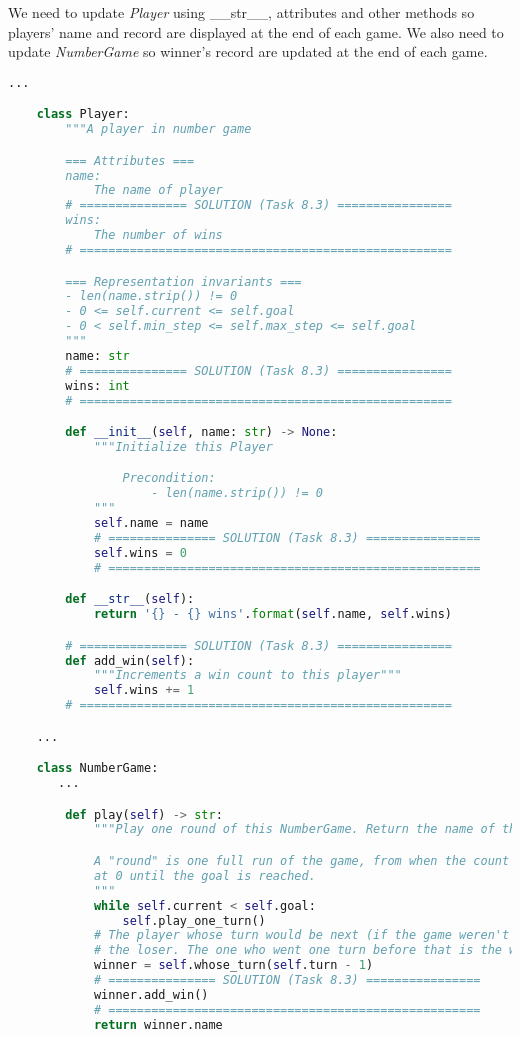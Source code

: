 \documentclass[12pt]{article}
\begin{document}
We need to update \textit{Player} using \_\_str\_\_, attributes and other methods
so players' name and record are displayed at the end of each game. We also need to
update \textit{NumberGame} so winner's record are updated at the end of each game.

\bigskip

\begin{lstlisting}[language=Python]
    ...

    class Player:
        """A player in number game

        === Attributes ===
        name:
            The name of player
        # =============== SOLUTION (Task 8.3) ================
        wins:
            The number of wins
        # ====================================================

        === Representation invariants ===
        - len(name.strip()) != 0
        - 0 <= self.current <= self.goal
        - 0 < self.min_step <= self.max_step <= self.goal
        """
        name: str
        # =============== SOLUTION (Task 8.3) ================
        wins: int
        # ====================================================

        def __init__(self, name: str) -> None:
            """Initialize this Player

                Precondition:
                    - len(name.strip()) != 0
            """
            self.name = name
            # =============== SOLUTION (Task 8.3) ================
            self.wins = 0
            # ====================================================

        def __str__(self):
            return '{} - {} wins'.format(self.name, self.wins)

        # =============== SOLUTION (Task 8.3) ================
        def add_win(self):
            """Increments a win count to this player"""
            self.wins += 1
        # ====================================================

    ...

    class NumberGame:
       ...

        def play(self) -> str:
            """Play one round of this NumberGame. Return the name of the winner.

            A "round" is one full run of the game, from when the count starts
            at 0 until the goal is reached.
            """
            while self.current < self.goal:
                self.play_one_turn()
            # The player whose turn would be next (if the game weren't over) is
            # the loser. The one who went one turn before that is the winner.
            winner = self.whose_turn(self.turn - 1)
            # =============== SOLUTION (Task 8.3) ================
            winner.add_win()
            # ====================================================
            return winner.name


\end{lstlisting}
\end{document}
